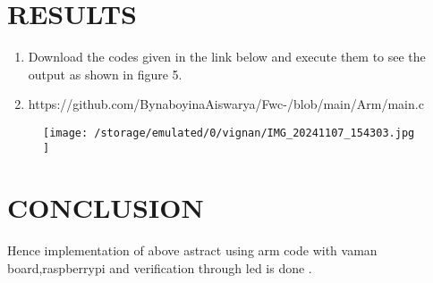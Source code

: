 \documentclass[conference]{IEEEtran}
\begin{document}
\section{RESULTS}
 \begin{enumerate}
\item Download the codes given in the link below and execute them to see the output as shown in figure 5.
\item https://github.com/BynaboyinaAiswarya/Fwc-/blob/main/Arm/main.c
 \end{enumerate}

 \begin{figure}[h]                       
\centering                               
\texttt{[image: 	/storage/emulated/0/vignan/IMG\_20241107\_154303.jpg
	 ]}                                
\caption{\label{fig-5:Gates}}             
\end{figure}
\section{CONCLUSION}
Hence implementation of above astract using arm code with vaman board,raspberrypi and verification through led is done .
\end{document}
